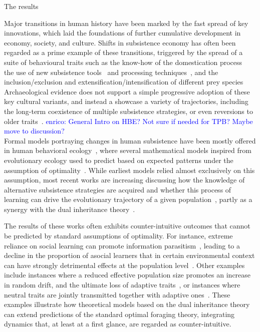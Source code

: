 \documentclass[preprint,authoryear]{elsarticle}
\newcommand{\memo}[2]{\textcolor{#1}{#2}}
\newcommand{\enrico}[1]{\memo{blue}{enrico: #1\\}}
\begin{document}
The results 







Major transitions in human history have been marked by the fast spread of key innovations, which laid the foundations of further cumulative development in economy, society, and culture. Shifts in subsistence economy has often been regarded as a prime example of these transitions, triggered by the spread of a suite of behavioural traits such as the know-how of the domestication process~\citep{barker2006} the use of new subsistence tools~\citep{petraglia_population_2009} and processing techniques~\citep{molleson1993}, and the inclusion/exclusion and extensification/intensification of different prey species %
Archaeological evidence does not support a simple progressive adoption of these key cultural variants, and instead a showcase a variety of trajectories, including the long-term coexistence of multiple subsistence strategies, or even reversions to older traits~\citep{rowley2001}.  
\enrico{General Intro on HBE? Not sure if needed for TPB? Maybe move to discussion?}
Formal models portraying changes in human subsistence have been mostly offered in human behavioral ecology~\citep{smith1992,bird2006,kennett2006}, where several mathematical models inspired from evolutionary ecology %
 used to predict  based on expected patterns under the assumption of optimality~\citep{belovsky1988}. 
While earliest models relied almost exclusively on this assumption, most recent works are increasing discussing how the knowledge of alternative subsistence strategies are acquired %
and whether this process of learning can drive the evolutionary trajectory of a given population~\citep{henrich1998}, partly as a synergy with the dual inheritance theory~\citep{boyd1985}. 

The results of these works often exhibits counter-intuitive outcomes that cannot be predicted by standard assumptions of optimality. For instance, extreme reliance on social learning can promote information parasitism~\citep{giraldeau2002}, leading to a decline in the proportion of asocial learners that in certain environmental context can have strongly detrimental effects at the population level~\citep{whitehead2009}. Other examples include instances where a reduced effective population size promotes an increase in random drift, and the ultimate loss of adaptive traits~\citep{henrich2004}, or instances where neutral traits are jointly transmitted together with adaptive ones~\citep{ackland2007}. These examples illustrate how theoretical models based on the dual inheritance theory can extend predictions of the standard optimal foraging theory, integrating dynamics that, at least at a first glance, are regarded as counter-intuitive. 
\end{document}
